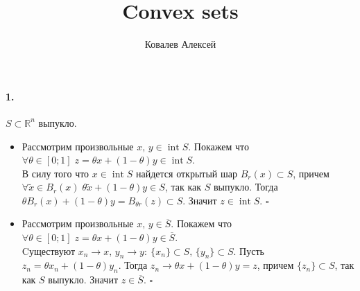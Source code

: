 \documentclass{article}
\title{Convex sets}
\author{Ковалев Алексей}
\date{}
\DeclareMathOperator{\interior}{int}
\newcommand*{\QED}{\null\nobreak\hfill\ensuremath{\square}}%
\newcommand*{\R}{\mathbb{R}}
\begin{document}
\maketitle

\paragraph{1.} $ S \subset \R^n $ выпукло.
\begin{itemize}
    \item Рассмотрим произвольные $ x,\, y \in \interior S $. Покажем что  $ \forall \theta \in [0; 1] \; z = \theta x + (1 - \theta) y \in \interior S $. \\
        В силу того что $x \in \interior S$ найдется открытый шар $B_r(x) \subset S$, причем $ \forall \tilde x \in B_r(x) \; \theta \tilde x + (1 - \theta) y \in S $, так как $S$ выпукло. Тогда $ \theta B_r(x) + (1 - \theta) y = B_{\theta r}(z) \subset S $. Значит $ z \in \interior S $. \QED 
    \item Рассмотрим произвольные $x,\, y \in \overline S$. Покажем что $ \forall \theta \in [0; 1] \; z = \theta x + (1 - \theta) y \in \overline S $. \\
        Cуществуют $x_n \to x,\, y_n \to y :\: \{ x_n \} \subset S,\, \{ y_n \} \subset S$. Пусть $ z_n = \theta x_n + (1 - \theta) y_n $. Тогда $ z_n \to \theta x + (1 - \theta) y = z $, причем $ \{ z_n \} \subset S $, так как $S$ выпукло. Значит $z \in \overline S$. \QED
\end{itemize}
\end{document}

